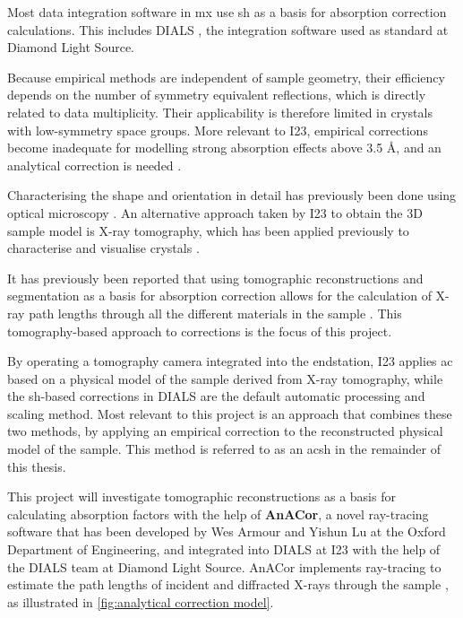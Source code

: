 Most data integration software in \ac{mx} use \ac{sh} as a basis for absorption correction calculations. This includes DIALS \cite{Winter2018}, the integration software used as standard at Diamond Light Source.

Because empirical methods are independent of sample geometry, their efficiency depends on the number of symmetry equivalent reflections, which is directly related to data multiplicity. Their applicability is therefore limited in crystals with low-symmetry space groups. More relevant to I23, empirical corrections become inadequate for modelling strong absorption effects above 3.5 Å, and an analytical correction is needed \cite{Kazantsev2021}.

Characterising the shape and orientation in detail has previously been done using optical microscopy \cite{Leal2008, Strutz2011}. %
An alternative approach taken by I23 to obtain the 3D sample model is X-ray tomography, which has been applied previously to characterise and visualise crystals \cite{Merrifield2011, Warren2013}.%

 It has previously been reported that using tomographic reconstructions and segmentation as a basis for absorption correction allows for the calculation of X-ray path lengths through all the different materials in the sample \cite{Brockhauser2008}. This tomography-based approach to corrections is the focus of this project.

By operating a tomography camera integrated into the endstation, I23 applies \ac{ac} based on a physical model of the sample derived from X-ray tomography, while the \ac{sh}-based corrections in DIALS are the default automatic processing and scaling method. Most relevant to this project is an approach that combines these two methods, by applying an empirical correction to the reconstructed physical model of the sample. This method is referred to as an \ac{acsh} in the remainder of this thesis. %

This project will investigate tomographic reconstructions as a basis for calculating absorption factors with the help of \textbf{AnACor}, a novel ray-tracing software that has been developed by Wes Armour and Yishun Lu at the Oxford Department of Engineering, and integrated into DIALS at I23 with the help of the DIALS team at Diamond Light Source. AnACor implements ray-tracing to estimate the path lengths of incident and diffracted X-rays through the sample \cite{Lu2024}, as illustrated in \cref{fig:analytical correction model}.

